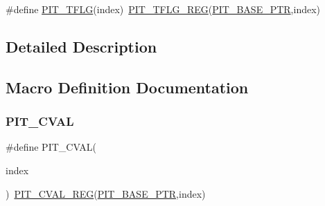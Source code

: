 \begin{DoxyCompactItemize}
\item 
\#define \hyperlink{group___p_i_t___register___accessor___macros_ga8a2ba0e5f954639237f66f2613c60023}{P\+I\+T\+\_\+\+T\+F\+LG}(index)~\hyperlink{group___p_i_t___register___accessor___macros_gae38fd2f9c8baca1504582bc5f3973932}{P\+I\+T\+\_\+\+T\+F\+L\+G\+\_\+\+R\+EG}(\hyperlink{group___p_i_t___peripheral_ga70be45f58402a8e6d2ce4df7b23aa41c}{P\+I\+T\+\_\+\+B\+A\+S\+E\+\_\+\+P\+TR},index)
\end{DoxyCompactItemize}


\subsection{Detailed Description}


\subsection{Macro Definition Documentation}
\mbox{\label{group___p_i_t___register___accessor___macros_ga83f3e2fa179556c64aec46ba2a4ff9c2}} 
\subsubsection{\texorpdfstring{P\+I\+T\+\_\+\+C\+V\+AL}{PIT\_CVAL}}
{\footnotesize\ttfamily \#define P\+I\+T\+\_\+\+C\+V\+AL(\begin{DoxyParamCaption}\item[{}]{index }\end{DoxyParamCaption})~\hyperlink{group___p_i_t___register___accessor___macros_gaac9edbb5229fcbcd8d71f5fdeab96590}{P\+I\+T\+\_\+\+C\+V\+A\+L\+\_\+\+R\+EG}(\hyperlink{group___p_i_t___peripheral_ga70be45f58402a8e6d2ce4df7b23aa41c}{P\+I\+T\+\_\+\+B\+A\+S\+E\+\_\+\+P\+TR},index)}

\mbox{\label{group___p_i_t___register___accessor___macros_ga1dac4545eedde3892dc8e7ae0cccef12}} 
